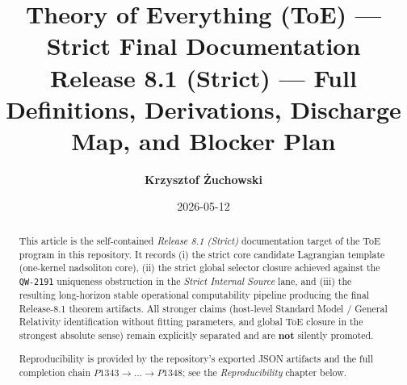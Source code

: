 \documentclass[11pt,a4paper]{article}
\title{\textbf{Theory of Everything (ToE) --- Strict Final Documentation}\\
\large Release 8.1 (Strict) --- Full Definitions, Derivations, Discharge Map, and Blocker Plan}
\author{\textbf{Krzysztof Żuchowski}}
\date{2026-05-12}
\begin{document}
\maketitle

\begin{abstract}
This article is the self-contained \emph{Release 8.1 (Strict)} documentation target of the ToE program in this repository.
It records (i) the strict core candidate Lagrangian template (one-kernel nadsoliton core), (ii) the strict global selector
closure achieved against the \texttt{QW-2191} uniqueness obstruction in the \emph{Strict Internal Source} lane, and (iii) the resulting
long-horizon stable operational computability pipeline producing the final Release-8.1 theorem artifacts.
All stronger claims (host-level Standard Model / General Relativity identification without fitting parameters, and global ToE closure in the strongest absolute sense)
remain explicitly separated and are \textbf{not} silently promoted.

Reproducibility is provided by the repository's exported JSON artifacts and the full completion chain $P1343 \rightarrow \dots \rightarrow P1348$; see the \emph{Reproducibility} chapter below.
\end{abstract}
\end{document}
